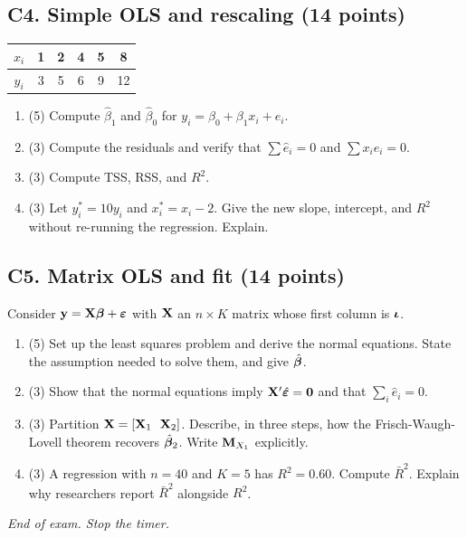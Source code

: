 \documentclass[11pt]{article}
\begin{document}
\subsection{C4. Simple OLS and rescaling (14 points)}
\begin{center}
\begin{tabular}{c|ccccc}
$x_i$ & 1 & 2 & 4 & 5 & 8 \\ \hline
$y_i$ & 3 & 5 & 6 & 9 & 12
\end{tabular}
\end{center}
\begin{enumerate}[label=(\alph*)]
\item (5) Compute $\hat\beta_1$ and $\hat\beta_0$ for $y_i=\beta_0+\beta_1x_i+e_i$.
\item (3) Compute the residuals and verify that $\sum\hat e_i=0$ and $\sum x_i\hat e_i=0$.
\item (3) Compute TSS, RSS, and $R^2$.
\item (3) Let $y^*_i=10y_i$ and $x^*_i=x_i-2$. Give the new slope, intercept, and $R^2$ without re-running the regression. Explain.
\end{enumerate}

\subsection{C5. Matrix OLS and fit (14 points)}
Consider $\mathbf{y}=\mathbf{X}\bm{\beta}+\bm{\varepsilon}$ with $\mathbf{X}$ an $n\times K$ matrix whose first column is $\bm{\iota}$.
\begin{enumerate}[label=(\alph*)]
\item (5) Set up the least squares problem and derive the normal equations. State the assumption needed to solve them, and give $\hat{\bm{\beta}}$.
\item (3) Show that the normal equations imply $\mathbf{X}'\hat{\bm{\varepsilon}}=\mathbf0$ and that $\sum_i\hat e_i=0$.
\item (3) Partition $\bX=[\bX_1\ \ \bX_2]$. Describe, in three steps, how the Frisch-Waugh-Lovell theorem recovers $\hat{\bm{\beta}}_2$. Write $\mathbf{M}_{X_1}$ explicitly.
\item (3) A regression with $n=40$ and $K=5$ has $R^2=0.60$. Compute $\bar R^2$. Explain why researchers report $\bar R^2$ alongside $R^2$.
\end{enumerate}

\vfill
\begin{center}\color{slate}\itshape End of exam. Stop the timer.\end{center}
\end{document}
